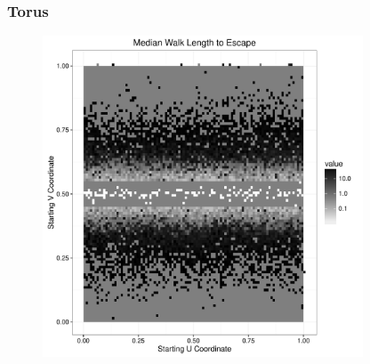 \documentclass{beamer}
\begin{document}
\begin{frame}
	
	\frametitle{Torus}
	
	\begin{figure}
		\includegraphics[width=0.85\textwidth]{images/TorusVBand.pdf}
	\end{figure}
	
\end{frame}
\end{document}

